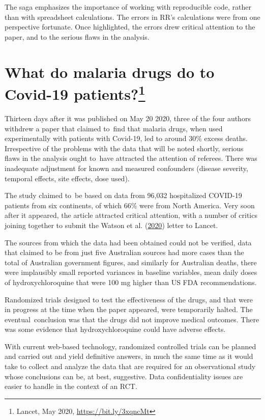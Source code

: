 \documentclass[
  10ptls,
  b5paper]{book}
\begin{document}
The saga emphasizes the importance of working with reproducible code,
rather than with spreadsheet calculations.
The errors in RR's calculations were from one perspective fortunate.
Once highlighted, the errors drew critical attention to the paper,
and to the serious flaws in the analysis.

\hypertarget{sec:lancet}{%
\section[What do malaria drugs do to Covid-19 patients?]{\texorpdfstring{What do malaria drugs do to Covid-19 patients?\footnote{Lancet, May 2020, \url{https://bit.ly/3xqncMt}}}{What do malaria drugs do to Covid-19 patients?}}\label{sec:lancet}}

Thirteen days after it was published on May 20 2020, three of the
four authors withdrew a paper that claimed to~find that malaria drugs,
when used experimentally with patients with Covid-19, led to around
30\% excess deaths. Irrespective of the problems with the data that
will be noted shortly, serious flaws in the analysis ought to~have
attracted the attention of referees. There was inadequate
adjustment for known and measured confounders (disease severity,
temporal effects, site effects, dose used).

The study claimed to~be based on data from 96,032
hospitalized COVID-19 patients from six continents, of which 66\%
were from North America. Very soon after it appeared, the article
attracted critical attention, with a number of critics joining
together to submit the Watson et al. (\protect\hyperlink{ref-watson2020open}{2020}) letter to Lancet.

The sources from which the data had been obtained could not be verified,
data that claimed to be from just five Australian sources had more
cases than the total of Australian government figures, and similarly
for Australian deaths, there were implausibly small reported variances
in baseline variables, mean daily doses of hydroxychloroquine that were
100 mg higher than US FDA recommendations.

Randomized trials designed to test the effectiveness of the drugs,
and that were in progress at the time when the paper appeared,
were temporarily halted. The eventual~conclusion was that the
drugs did not improve medical outcomes. There was some evidence
that hydroxychloroquine could have adverse effects.

With current web-based technology, randomized controlled trials
can be planned and carried out and yield definitive answers, in
much the same time as it would take to collect and analyze the
data that are required for an observational study whose
conclusions can be, at best, suggestive. Data confidentiality
issues are easier to handle in the context of an RCT.
\end{document}
